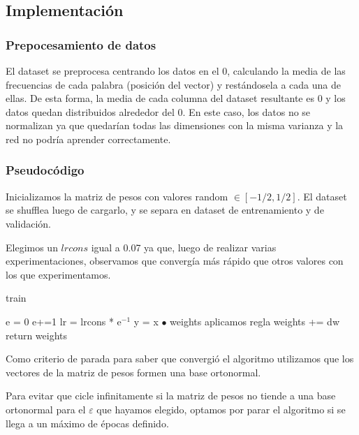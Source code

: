 \subsection{Implementación}

\subsubsection{Prepocesamiento de datos}

El dataset se preprocesa centrando los datos en el 0, calculando la media de las frecuencias de cada palabra (posición del vector) y restándosela a cada una de ellas. De esta forma, la media de cada columna del dataset resultante es 0 y los datos quedan distribuidos alrededor del 0. En este caso, los datos no se normalizan ya que quedarían todas las dimensiones con la misma varianza y la red no podría aprender correctamente.

\subsubsection{Pseudocódigo}

Inicializamos la matriz de pesos con valores random $\in[-1/2, 1/2]$. El dataset se shufflea luego de cargarlo, y se separa en dataset de entrenamiento y de validación.

Elegimos un $lrcons$ igual a 0.07 ya que, luego de realizar varias experimentaciones, observamos que convergía más rápido que otros valores con los que experimentamos.

\begin{algorithm}[H]
\caption{train}
\begin{algorithmic}
	\State e = 0
        \State e+=1
        \State lr = lrcons * e$^{-1}$
            \State y = x $\bullet$ weights
            \State aplicamos regla
            \State weights += dw
        \EndFor
    \EndWhile
    \State return weights
\end{algorithmic}
\end{algorithm}

Como criterio de parada para saber que convergió el algoritmo utilizamos que los vectores de la matriz de pesos formen una base ortonormal. 

Para evitar que cicle infinitamente si la matriz de pesos no tiende a una base ortonormal para el $\varepsilon$ que hayamos elegido, optamos por parar el algoritmo si se llega a un máximo de épocas definido.

